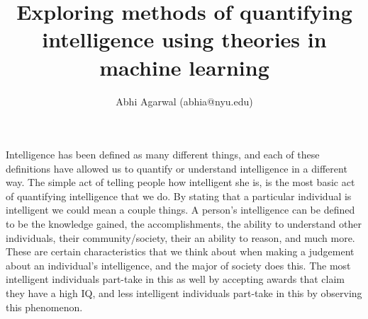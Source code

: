 \documentclass[11pt, oneside]{article}
\title{Exploring methods of quantifying intelligence using theories in machine learning}
\author{Abhi Agarwal (abhia@nyu.edu)}
\date{}
\begin{document}
\maketitle






\par 


\par 
Intelligence has been defined as many different things, and each of these definitions have allowed us to quantify or understand intelligence in a different way. The simple act of telling people how intelligent she is, is the most basic act of quantifying intelligence that we do. By stating that a particular individual is intelligent we could mean a couple things. A person's intelligence can be defined to be the knowledge gained, the accomplishments, the ability to understand other individuals, their community/society, their an ability to reason, and much more. These are certain characteristics that we think about when making a judgement about an individual's intelligence, and the major of society does this. The most intelligent individuals part-take in this as well by accepting awards that claim they have a high IQ, and less intelligent individuals part-take in this by observing this phenomenon.
\end{document}
